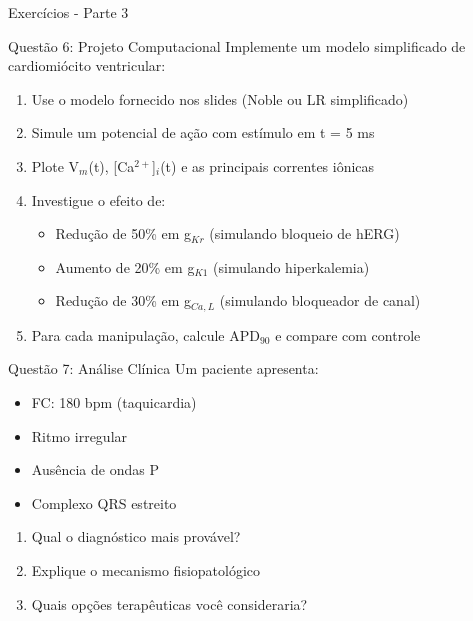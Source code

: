 \begin{frame}{Exercícios - Parte 3}
\begin{alertblock}{Questão 6: Projeto Computacional}
Implemente um modelo simplificado de cardiomiócito ventricular:
\begin{enumerate}
    \item Use o modelo fornecido nos slides (Noble ou LR simplificado)
    \item Simule um potencial de ação com estímulo em t = 5 ms
    \item Plote V$_m$(t), [Ca$^{2+}$]$_i$(t) e as principais correntes iônicas
    \item Investigue o efeito de:
    \begin{itemize}
        \item Redução de 50\% em g$_{Kr}$ (simulando bloqueio de hERG)
        \item Aumento de 20\% em g$_{K1}$ (simulando hiperkalemia)
        \item Redução de 30\% em g$_{Ca,L}$ (simulando bloqueador de canal)
    \end{itemize}
    \item Para cada manipulação, calcule APD$_{90}$ e compare com controle
\end{enumerate}
\end{alertblock}

\begin{block}{Questão 7: Análise Clínica}
Um paciente apresenta:
\begin{itemize}
    \item FC: 180 bpm (taquicardia)
    \item Ritmo irregular
    \item Ausência de ondas P
    \item Complexo QRS estreito
\end{itemize}
\begin{enumerate}
    \item Qual o diagnóstico mais provável?
    \item Explique o mecanismo fisiopatológico
    \item Quais opções terapêuticas você consideraria?
\end{enumerate}
\end{block}
\end{frame}

